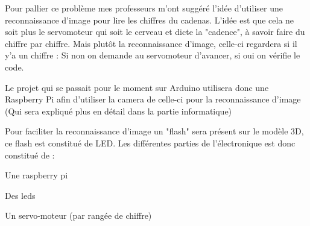 \documentclass[twoside]{article}
\begin{document}
\begin{multicols}{2}
Pour pallier ce problème mes professeurs m'ont suggéré l'idée d'utiliser une reconnaissance d'image pour lire les chiffres du cadenas. L'idée est que cela ne soit plus le servomoteur qui soit le cerveau et dicte la "cadence", à savoir faire du chiffre par chiffre. Mais plutôt la reconnaissance d'image, celle-ci regardera si il y'a un chiffre : Si non on demande au servomoteur d'avancer, si oui on vérifie le code.

Le projet qui se passait pour le moment sur Arduino utilisera donc une Raspberry Pi afin d'utiliser la camera de celle-ci pour la reconnaissance d'image (Qui sera expliqué plus en détail dans la partie informatique)

Pour faciliter la reconnaissance d'image un "flash" sera présent sur le modèle 3D, ce flash est constitué de LED. Les différentes parties de l'électronique est donc constitué de : 

\begin{compactitem}
\item Une raspberry pi
\item Des leds
\item Un servo-moteur (par rangée de chiffre)
\end{compactitem}



\end{multicols}
\end{document}
